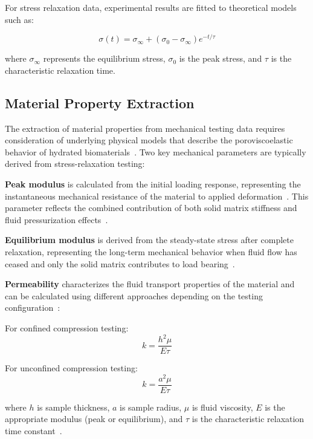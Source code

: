 For stress relaxation data, experimental results are fitted to theoretical models such as:

$$\sigma(t) = \sigma_{\infty} + (\sigma_0 - \sigma_{\infty})e^{-t/\tau}$$

where $\sigma_{\infty}$ represents the equilibrium stress, $\sigma_0$ is the peak stress, and $\tau$ is the characteristic relaxation time.

\subsection{Material Property Extraction}

The extraction of material properties from mechanical testing data requires consideration of underlying physical models that describe the poroviscoelastic behavior of hydrated biomaterials~\cite{ateshian1997finitedeformation}. Two key mechanical parameters are typically derived from stress-relaxation testing:

\textbf{Peak modulus} is calculated from the initial loading response, representing the instantaneous mechanical resistance of the material to applied deformation~\cite{boschetti2004biomechanicalproperties}. This parameter reflects the combined contribution of both solid matrix stiffness and fluid pressurization effects~\cite{ateshian1997finitedeformation}.

\textbf{Equilibrium modulus} is derived from the steady-state stress after complete relaxation, representing the long-term mechanical behavior when fluid flow has ceased and only the solid matrix contributes to load bearing~\cite{buschmannconfinedcompression,koch2022mechanicalproperties}.

\textbf{Permeability} characterizes the fluid transport properties of the material and can be calculated using different approaches depending on the testing configuration~\cite{mansour1976permeabilityarticular,loverde2024compressioncycling, nakagawa2019longtermevaluation}:

For confined compression testing:
\begin{equation}
k = \frac{h^2 \mu}{E \tau}
\end{equation}

For unconfined compression testing:
\begin{equation}
k = \frac{a^2 \mu}{E \tau}
\end{equation}

where $h$ is sample thickness, $a$ is sample radius, $\mu$ is fluid viscosity, $E$ is the appropriate modulus (peak or equilibrium), and $\tau$ is the characteristic relaxation time constant~\cite{ateshian1997finitedeformation, boschetti2004biomechanicalproperties}.

